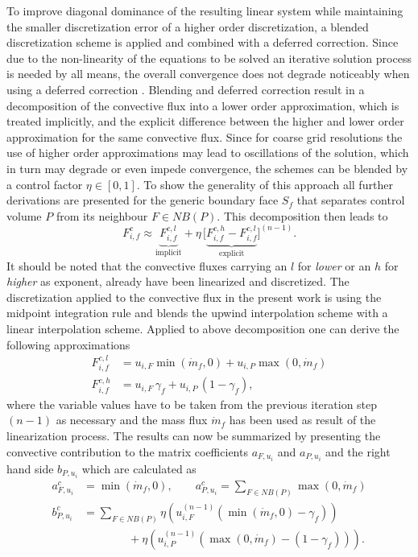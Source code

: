       To improve diagonal dominance of the resulting linear system while maintaining the smaller discretization error of a higher order discretization, a blended discretization scheme is applied and combined with a deferred correction. Since due to the non-linearity of the equations to be solved an iterative solution process is needed by all means, the overall convergence does not degrade noticeably when using a deferred correction \cite{ferziger02}. Blending and deferred correction result in a decomposition of the convective flux into a lower order approximation, which is treated implicitly, and the explicit difference between the higher and lower order approximation for the same convective flux. Since for coarse grid resolutions the use of higher order approximations may lead to oscillations of the solution, which in turn may degrade or even impede convergence, the schemes can be blended by a control factor \( \eta \in [0,1]\). To show the generality of this approach all further derivations are presented for the generic boundary face \(S_f\) that separates control volume \(P\) from its neighbour \(F \in NB(P)\). This decomposition then leads to
      \begin{displaymath}
        F_{i,f}^c \approx  \underbrace{F_{i,f}^{c,l}}_{\text{implicit}} + \eta \, \bigl[\underbrace{ F_{i,f}^{c,h} - F_{i,f}^{c,l} }_{\text{explicit}}\bigr]^{(n-1)}.
      \end{displaymath}
      It should be noted that the convective fluxes carrying an \(l\) for \emph{lower} or an \(h\) for \emph{higher} as exponent, already have been linearized and discretized. The discretization applied to the convective flux in the present work is using the midpoint integration rule and blends the upwind interpolation scheme with a linear interpolation scheme. Applied to above decomposition one can derive the following approximations
      \begin{align*}
        F_{i,f}^{c,l} &= u_{i,F} \min(\dot{m}_f ,0) + u_{i,P} \max(0,\dot{m}_f) \\
        F_{i,f}^{c,h} &= u_{i,F} \, \gamma_f + u_{i,P} \, (1 - \gamma_f),
      \end{align*}
      where the variable values have to be taken from the previous iteration step \((n-1)\) as necessary and the mass flux \(\dot{m}_f\) has been used as result of the linearization process. The results can now be summarized by presenting the convective contribution to the matrix coefficients \(a_{F,u_i}\) and \(a_{P,u_i}\) and the right hand side \(b_{P,u_i}\) which are calculated as
      \begin{subequations}
      \begin{align}
        a_{F,u_i}^c &= \min(\dot{m}_f ,0), \quad \quad a_{P,u_i}^c = \sum_{F \in NB(P)} \max(0,\dot{m}_f) \\[1em]
        b_{P,u_i}^c &= \sum_{F \in NB(P)} \eta  \left(u_{i,F}^{(n-1)} \left( \min(\dot{m}_f,0) - \gamma_f \right)\right) \nonumber \\
                    &\quad \quad \quad  \quad+ \eta \left( u_{i,P}^{(n-1)} \left( \max(0,\dot{m}_f) - \left(1 - \gamma_f\right) \right)\right).
      \end{align}
    \end{subequations}


